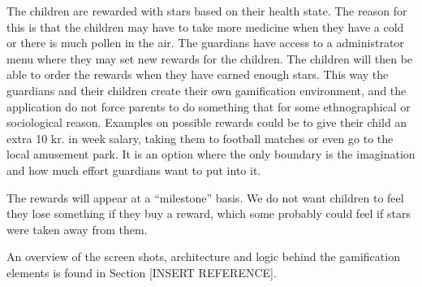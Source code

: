 The children are rewarded with stars based on their health state. The reason for this is that the children may have to take more medicine when they have a cold or there is much pollen in the air. The guardians have access to a administrator menu where they may set new rewards for the children. The children will then be able to order the rewards when they have earned enough stars. This way the guardians and their children create their own gamification environment, and the application do not force parents to do something that for some ethnographical or sociological reason. Examples on possible rewards could be to give their child an extra 10 kr. in week salary, taking them to football matches or even go to the local amusement park. It is an option where the only boundary is the imagination and how much effort guardians want to put into it.    


The rewards will appear at a ``milestone'' basis. We do not want children to feel they lose something if they buy a reward, which some probably could feel if stars were taken away from them.


An overview of the screen shots, architecture and logic behind the gamification elements is found in Section [INSERT REFERENCE].

